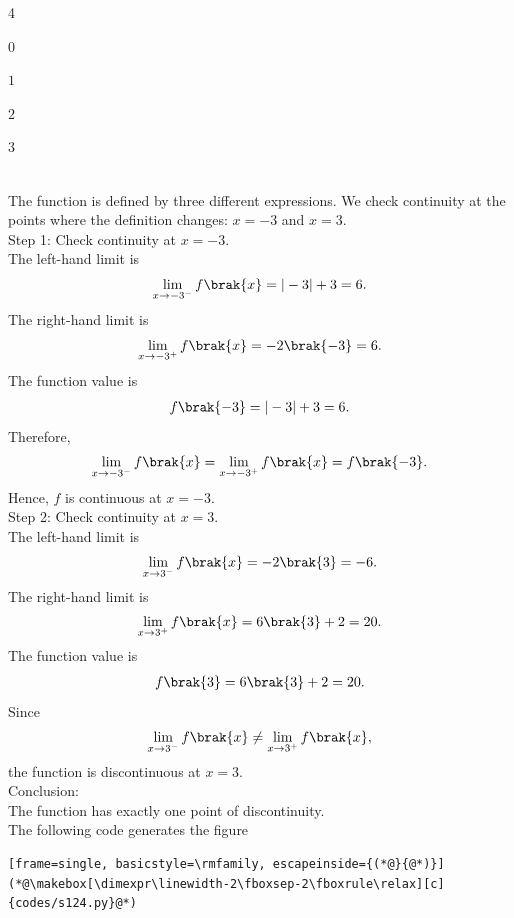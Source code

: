 \begin{enumerate}[label=\thesubsection.\arabic*, ref=\thesubsection.\theenumi]
\begin{enumerate}
\begin{multicols}{4}
    \item $0$
    \item $1$
    \item $2$
    \item $3$
    \end{multicols}
\end{enumerate}
\solution
\\The function is defined by three different expressions.
We check continuity at the points where the definition changes:
$x=-3$ and $x=3$.
\\{Step 1: Check continuity at $x=-3$.}
\\The left-hand limit is
\begin{align}
\lim_{x\to-3^-}f\brak{x}
=|-3|+3=6.
\end{align}
The right-hand limit is
\begin{align}
\lim_{x\to-3^+}f\brak{x}
=-2\brak{-3}=6.
\end{align}
The function value is
\begin{align}
f\brak{-3}=|-3|+3=6.
\end{align}
Therefore,
\begin{align}
\lim_{x\to-3^-}f\brak{x}
=\lim_{x\to-3^+}f\brak{x}=f\brak{-3}.
\end{align}
Hence, $f$ is continuous at $x=-3$.
\\{Step 2: Check continuity at $x=3$.}
\\The left-hand limit is
\begin{align}
\lim_{x\to3^-}f\brak{x}=-2\brak{3}=-6.
\end{align}
The right-hand limit is
\begin{align}
\lim_{x\to3^+}f\brak{x}=6\brak{3}+2=20.
\end{align}
The function value is
\begin{align}
f\brak{3}=6\brak{3}+2=20.
\end{align}
Since
\begin{align}
\lim_{x\to3^-}f\brak{x}
\neq
\lim_{x\to3^+}f\brak{x},
\end{align}
the function is discontinuous at $x=3$.
\\{Conclusion:}
\\The function has exactly one point of discontinuity.
\\The following code generates the figure
\begin{lstlisting}[frame=single, basicstyle=\rmfamily, escapeinside={(*@}{@*)}]
(*@\makebox[\dimexpr\linewidth-2\fboxsep-2\fboxrule\relax][c]{codes/s124.py}@*)
\end{lstlisting}
\begin{figure}[ht]
    \centering


\end{figure}
\end{enumerate}
